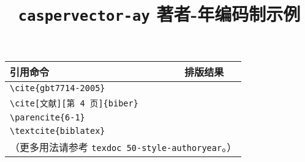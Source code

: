 \documentclass[UTF8]{ctexart}
\begin{document}
\title{\textbf{\texttt{caspervector-ay} 著者-年编码制示例}}
\author{}
\date{}
\maketitle
\vspace*{-1em}

\begin{center}
\begin{tabular}{ll}
\hline
引用命令 &	排版结果 \\\hline
\verb|\cite{gbt7714-2005}| &	\cite{gbt7714-2005} \\
\verb|\cite[文献][第 4 页]{biber}| &	\cite[文献][第 4 页]{biber} \\
\verb|\parencite{6-1}| &	\parencite{6-1} \\
\verb|\textcite{biblatex}| &	\textcite{biblatex} \\\hline
\multicolumn{2}{l}{（更多用法请参考 \texttt{texdoc 50-style-authoryear}。）} \\
\end{tabular}
\end{center}
\vspace*{1em}

\printbibliography
\nocite{*}
\end{document}

